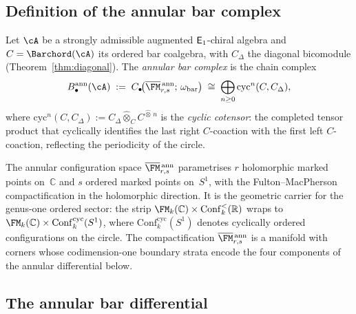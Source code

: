 \subsection{Definition of the annular bar complex}

\begin{definition}%
\label{def:annular-bar}%
%
%
Let $\cA$ be a strongly admissible augmented $\mathsf{E}_1$-chiral
algebra and $C=\Barchord(\cA)$ its ordered
bar coalgebra, with $C_\Delta$ the diagonal bicomodule
(Theorem~\ref{thm:diagonal}).
The \emph{annular bar complex} is the chain complex
\[
B^{\mathrm{ann}}_\bullet(\cA)
\;:=\;
C_\bullet\!\bigl(
 \overline{\FM}{}^{\,\mathrm{ann}}_{r,s};\,
 \omega_{\mathrm{bar}}
\bigr)
\;\cong\;
\bigoplus_{n\ge 0}
 \mathrm{cyc}^n(C,C_\Delta),
\]
where $\mathrm{cyc}^n(C,C_\Delta):=
C_\Delta\widehat\otimes_C C^{\widehat\otimes\,n}$ is the
\emph{cyclic cotensor}:
the completed tensor product that cyclically identifies the
last right $C$-coaction with the first left $C$-coaction,
reflecting the periodicity of the circle.
\end{definition}

The annular configuration space
$\overline{\FM}{}^{\,\mathrm{ann}}_{r,s}$ parametrises
$r$ holomorphic marked points on~$\mathbb{C}$ and $s$ ordered
marked points on~$S^1$, with the Fulton--MacPherson
compactification in the holomorphic direction. It is the
geometric carrier for the genus-one ordered sector: the strip
$\FM_k(\mathbb{C})\times\mathrm{Conf}_k^{<}(\mathbb{R})$ wraps to
$\FM_k(\mathbb{C})\times\mathrm{Conf}_k^{\mathrm{cyc}}(S^1)$,
where $\mathrm{Conf}_k^{\mathrm{cyc}}(S^1)$ denotes cyclically
ordered configurations on the circle. The compactification
$\overline{\FM}{}^{\,\mathrm{ann}}_{r,s}$ is a manifold with
corners whose codimension-one boundary strata encode the four
components of the annular differential below.

\subsection{The annular bar differential}

